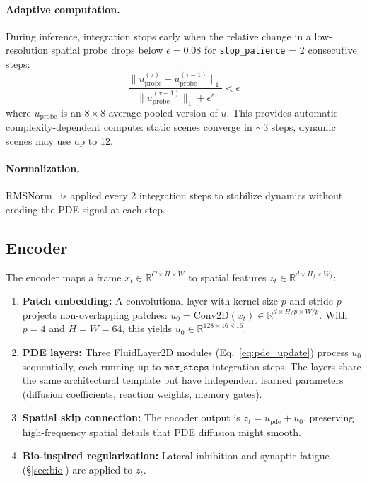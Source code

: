 \documentclass{article}
\newcommand{\R}{\mathbb{R}}
\begin{document}
\paragraph{Adaptive computation.} During inference, integration stops early when the relative change in a low-resolution spatial probe drops below $\epsilon = 0.08$ for \texttt{stop\_patience} = 2 consecutive steps:
\begin{equation}
    \frac{\|u^{(\tau)}_{\text{probe}} - u^{(\tau-1)}_{\text{probe}}\|_1}{\|u^{(\tau-1)}_{\text{probe}}\|_1 + \epsilon'} < \epsilon
    \label{eq:adaptive}
\end{equation}
where $u_{\text{probe}}$ is an $8\times 8$ average-pooled version of $u$. This provides automatic complexity-dependent compute: static scenes converge in $\sim$3 steps, dynamic scenes may use up to 12.

\paragraph{Normalization.} RMSNorm~\cite{zhang2019rmsnorm} is applied every 2 integration steps to stabilize dynamics without eroding the PDE signal at each step.

\subsection{Encoder}
\label{sec:encoder}

The encoder maps a frame $x_t \in \R^{C \times H \times W}$ to spatial features $z_t \in \R^{d \times H_f \times W_f}$:

\begin{enumerate}
    \item \textbf{Patch embedding:} A convolutional layer with kernel size $p$ and stride $p$ projects non-overlapping patches: $u_0 = \text{Conv2D}(x_t) \in \R^{d \times H/p \times W/p}$. With $p=4$ and $H=W=64$, this yields $u_0 \in \R^{128 \times 16 \times 16}$.

    \item \textbf{PDE layers:} Three FluidLayer2D modules (Eq.~\ref{eq:pde_update}) process $u_0$ sequentially, each running up to $\texttt{max\_steps}$ integration steps. The layers share the same architectural template but have independent learned parameters (diffusion coefficients, reaction weights, memory gates).

    \item \textbf{Spatial skip connection:} The encoder output is $z_t = u_{\text{pde}} + u_0$, preserving high-frequency spatial details that PDE diffusion might smooth.

    \item \textbf{Bio-inspired regularization:} Lateral inhibition and synaptic fatigue (\S\ref{sec:bio}) are applied to $z_t$.
\end{enumerate}
\end{document}

